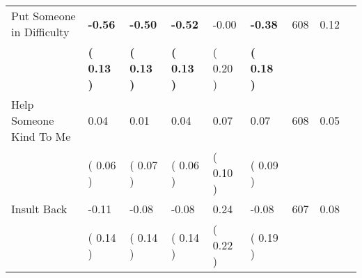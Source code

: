 \begin{tabular}{L{6.2cm} C{1.8cm} C{1.8cm} C{1.8cm} C{1.8cm} C{1.8cm} C{1.8cm} C{0.3cm} C{0.3cm}}
Put Someone in Difficulty & \textbf{    -0.56} & \textbf{    -0.50} & \textbf{    -0.52} &     -0.00 & \textbf{    -0.38}  & 608 &       0.12 \\ 
 & \textbf{(     0.13 )} & \textbf{(     0.13 )} & \textbf{(     0.13 )} & (     0.20 ) & \textbf{(     0.18 )}  & \\
Help Someone Kind To Me &      0.04 &      0.01 &      0.04 &      0.07 &      0.07  & 608 &       0.05 \\ 
 & (     0.06 ) & (     0.07 ) & (     0.06 ) & (     0.10 ) & (     0.09 )  & \\
Insult Back &     -0.11 &     -0.08 &     -0.08 &      0.24 &     -0.08  & 607 &       0.08 \\ 
 & (     0.14 ) & (     0.14 ) & (     0.14 ) & (     0.22 ) & (     0.19 )  & \\
\bottomrule
\end{tabular}
